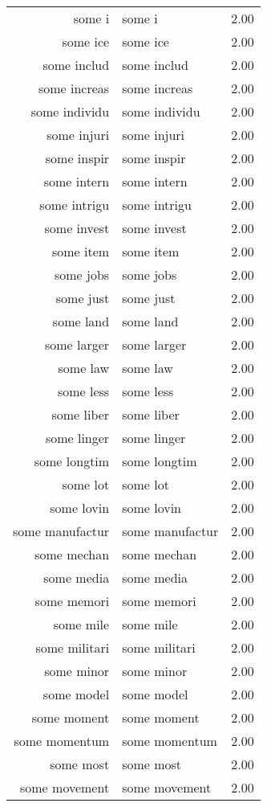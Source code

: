 \begin{table}[ht]
\begin{tabular}{rlr}
  some i & some i & 2.00 \\ 
  some ice & some ice & 2.00 \\ 
  some includ & some includ & 2.00 \\ 
  some increas & some increas & 2.00 \\ 
  some individu & some individu & 2.00 \\ 
  some injuri & some injuri & 2.00 \\ 
  some inspir & some inspir & 2.00 \\ 
  some intern & some intern & 2.00 \\ 
  some intrigu & some intrigu & 2.00 \\ 
  some invest & some invest & 2.00 \\ 
  some item & some item & 2.00 \\ 
  some jobs & some jobs & 2.00 \\ 
  some just & some just & 2.00 \\ 
  some land & some land & 2.00 \\ 
  some larger & some larger & 2.00 \\ 
  some law & some law & 2.00 \\ 
  some less & some less & 2.00 \\ 
  some liber & some liber & 2.00 \\ 
  some linger & some linger & 2.00 \\ 
  some longtim & some longtim & 2.00 \\ 
  some lot & some lot & 2.00 \\ 
  some lovin & some lovin & 2.00 \\ 
  some manufactur & some manufactur & 2.00 \\ 
  some mechan & some mechan & 2.00 \\ 
  some media & some media & 2.00 \\ 
  some memori & some memori & 2.00 \\ 
  some mile & some mile & 2.00 \\ 
  some militari & some militari & 2.00 \\ 
  some minor & some minor & 2.00 \\ 
  some model & some model & 2.00 \\ 
  some moment & some moment & 2.00 \\ 
  some momentum & some momentum & 2.00 \\ 
  some most & some most & 2.00 \\ 
  some movement & some movement & 2.00 \\ 

\end{tabular}
\end{table}
